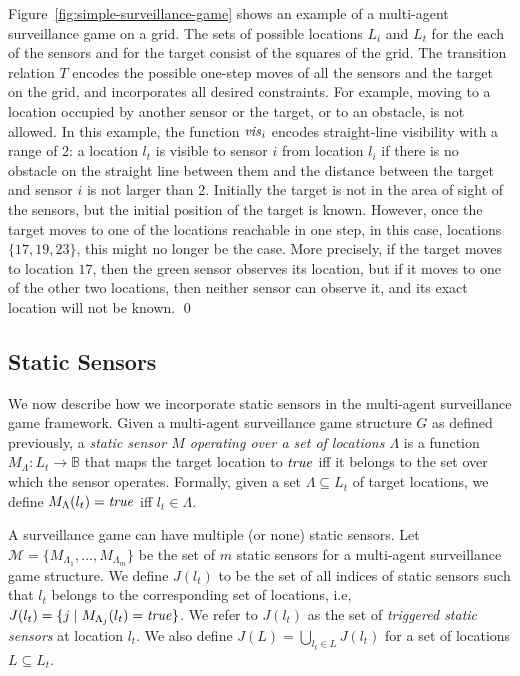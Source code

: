 \begin{example}\label{ex:simple-surveillance-game}
Figure~\ref{fig:simple-surveillance-game} shows an example of a multi-agent surveillance game on a grid.  The sets of possible locations $L_i$ and $L_t$ for the each of the sensors and for the target consist of the squares of the  grid. The transition relation $T$ encodes the possible one-step moves of all the sensors and the target on the grid, and incorporates all desired constraints. For example, moving to a location occupied by another sensor or the target, or to an obstacle, is not allowed.
In this example, the function $\mathit{vis}_i$ encodes straight-line visibility with a range of 2: a location $l_t$ is visible to sensor $i$ from location $l_i$ if there is no obstacle on the straight line between them and the distance between the target and sensor $i$ is not larger than 2. Initially the target is not in the area of sight of the sensors, but the initial position of the target is known. However, once the target moves to one of the locations reachable in one step, in this case, locations $\{17,19,23\}$, this might no longer be the case. More precisely, if the target moves to location $17$, then the green sensor observes its location, but if it moves to one of the other two locations, then neither sensor can observe it, and its exact location will not be known. \qed
\end{example}


\subsection{Static Sensors}
We now describe how we incorporate static sensors in the multi-agent surveillance game framework. Given a multi-agent surveillance game structure $G$ as defined previously, a \emph{static sensor $M$ operating over a set of locations $\Lambda$} is a function $M_{\Lambda} : L_t \rightarrow \mathbb{B}$ that maps the target location to $\mathit{true}$ iff it belongs to the set  over which the sensor operates.  Formally, given a set $\Lambda \subseteq L_t$ of target locations, we define $M_{\Lambda}(l_t) = \mathit{true}$ iff $l_t \in \Lambda$. 

A surveillance game can have multiple (or none) static sensors. Let $\mathcal{M} = \{M_{\Lambda_1},\dots,M_{\Lambda_m}\}$ be the set of $m$ static sensors for a multi-agent surveillance game structure. We define $J(l_t)$ to be the set of all indices of static sensors such that $l_t$ belongs to the corresponding set of locations, i.e, $J(l_t) = \{j \mid M_{\Lambda_j}(l_t) = \mathit{true}\}$. We refer to $J(l_t)$ as the set of \emph{triggered static sensors} at location $l_t$. We also define $J(L) = \bigcup_{l_t \in L} J(l_t)$ for a set of locations $L \subseteq L_t$. 

